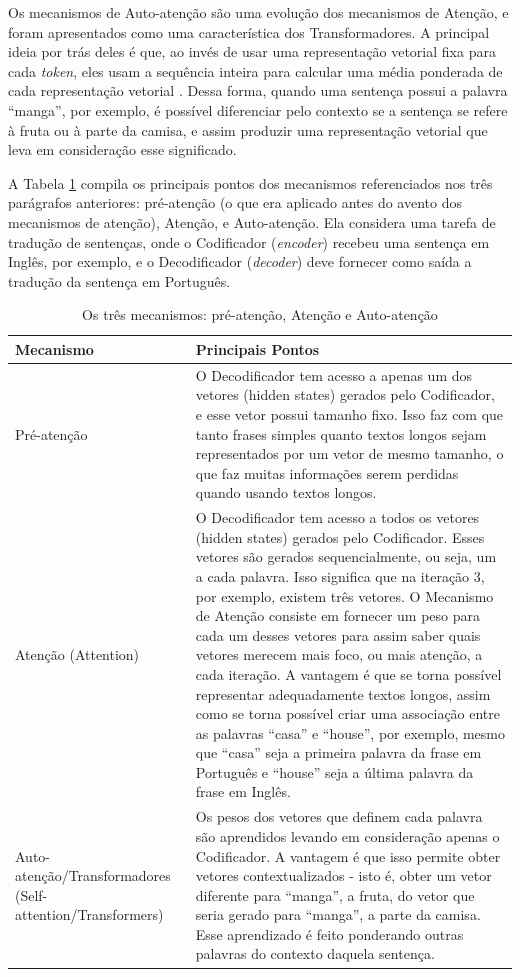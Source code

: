 Os mecanismos de Auto-atenção são uma evolução dos mecanismos de Atenção, e foram apresentados como uma característica dos Transformadores. A principal ideia por trás deles é que, ao invés de usar uma representação vetorial fixa para cada \textit{token}, eles usam a sequência inteira para calcular uma média ponderada de cada representação vetorial \cite{transformers_book}. Dessa forma, quando uma sentença possui a palavra ``manga'', por exemplo, é possível diferenciar pelo contexto se a sentença se refere à fruta ou à parte da camisa, e assim produzir uma representação vetorial que leva em consideração esse significado.

A Tabela \ref{tab:attentions} compila os principais pontos dos mecanismos referenciados nos três parágrafos anteriores: pré-atenção (o que era aplicado antes do avento dos mecanismos de atenção), Atenção, e Auto-atenção. Ela considera uma tarefa de tradução de sentenças, onde o Codificador (\textit{encoder}) recebeu uma sentença em Inglês, por exemplo, e o Decodificador (\textit{decoder}) deve fornecer como saída a tradução da sentença em Português. 

\begin{table}[htb]
\centering
\caption{Os três mecanismos: pré-atenção, Atenção e Auto-atenção}
\begin{tabular}{|p{5cm}|p{10cm}|}
\hline
Mecanismo & Principais Pontos \\
\hline
Pré-atenção & O Decodificador tem acesso a apenas um dos vetores (hidden states) gerados pelo Codificador, e esse vetor possui tamanho fixo. Isso faz com que tanto frases simples quanto textos longos sejam representados por um vetor de mesmo tamanho, o que faz muitas informações serem perdidas quando usando textos longos. \\
\hline
Atenção (Attention) & O Decodificador tem acesso a todos os vetores (hidden states) gerados pelo Codificador. Esses vetores são gerados sequencialmente, ou seja, um a cada palavra. Isso significa que na iteração 3, por exemplo, existem três vetores. O Mecanismo de Atenção consiste em fornecer um peso para cada um desses vetores para assim saber quais vetores merecem mais foco, ou mais atenção, a cada iteração. A vantagem é que se torna possível representar adequadamente textos longos, assim como se torna possível criar uma associação entre as palavras ``casa'' e ``house'', por exemplo, mesmo que ``casa'' seja a primeira palavra da frase em Português e ``house'' seja a última palavra da frase em Inglês. \\
\hline
Auto-atenção/Transformadores (Self-attention/Transformers) & Os pesos dos vetores que definem cada palavra são aprendidos levando em consideração apenas o Codificador. A vantagem é que isso permite obter vetores contextualizados - isto é, obter um vetor diferente para ``manga'', a fruta, do vetor que seria gerado para ``manga'', a parte da camisa. Esse aprendizado é feito ponderando outras palavras do contexto daquela sentença. \\
\hline
\end{tabular}
\label{tab:attentions}
\end{table}

